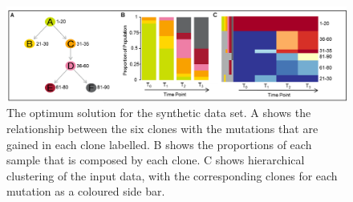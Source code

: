 \documentclass[a4paper]{article}\usepackage[]{graphicx}\usepackage[]{color}
\begin{document}

\begin{figure}[H]
    \centering
    \includegraphics[width=\textwidth]{synthetic_abc.png}
    \caption{The optimum solution for the synthetic data set.  A shows the relationship between the six clones with the mutations
    that are gained in each clone labelled.  B shows the proportions of each sample that is composed by each clone.  C shows 
    hierarchical clustering of the input data, with the corresponding clones for each mutation as a coloured side bar.}
\end{figure}
\end{document}
